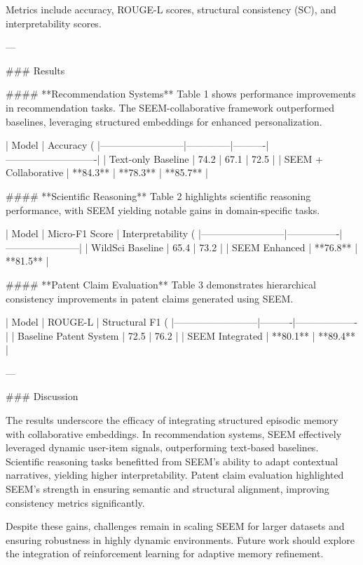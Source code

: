 Metrics include accuracy, ROUGE-L scores, structural consistency (SC), and interpretability scores.

---

### Results  

#### **Recommendation Systems**  
Table 1 shows performance improvements in recommendation tasks. The SEEM-collaborative framework outperformed baselines, leveraging structured embeddings for enhanced personalization.  

| Model                    | Accuracy (%
|--------------------------|--------------|----------|----------------------------|  
| Text-only Baseline       | 74.2         | 67.1     | 72.5                       |  
| SEEM + Collaborative     | **84.3**     | **78.3** | **85.7**                   |  

#### **Scientific Reasoning**  
Table 2 highlights scientific reasoning performance, with SEEM yielding notable gains in domain-specific tasks.  

| Model                    | Micro-F1 Score | Interpretability (%
|--------------------------|----------------|-----------------------|  
| WildSci Baseline         | 65.4           | 73.2                 |  
| SEEM Enhanced            | **76.8**       | **81.5**             |  

#### **Patent Claim Evaluation**  
Table 3 demonstrates hierarchical consistency improvements in patent claims generated using SEEM.  

| Model                    | ROUGE-L | Structural F1 (%
|--------------------------|----------|-------------------|  
| Baseline Patent System   | 72.5     | 76.2              |  
| SEEM Integrated          | **80.1** | **89.4**          |  

---

### Discussion  

The results underscore the efficacy of integrating structured episodic memory with collaborative embeddings. In recommendation systems, SEEM effectively leveraged dynamic user-item signals, outperforming text-based baselines. Scientific reasoning tasks benefitted from SEEM’s ability to adapt contextual narratives, yielding higher interpretability. Patent claim evaluation highlighted SEEM's strength in ensuring semantic and structural alignment, improving consistency metrics significantly.

Despite these gains, challenges remain in scaling SEEM for larger datasets and ensuring robustness in highly dynamic environments. Future work should explore the integration of reinforcement learning for adaptive memory refinement.


